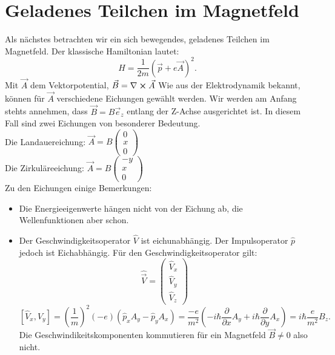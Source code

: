 \documentclass{report}
\begin{document}
\section{Geladenes Teilchen im Magnetfeld}
Als nächstes betrachten wir ein sich bewegendes, geladenes Teilchen im Magnetfeld. Der klassische Hamiltonian lautet: \[
	H = \frac{1}{2m} (\vec{p} + e\vec{A})^2
.\] Mit $\vec{A}$ dem Vektorpotential, $\vec{B} = \nabla \cross \vec{A}$
Wie aus der Elektrodynamik bekannt, können für $\vec{A}$ verschiedene Eichungen gewählt werden. Wir werden am Anfang stehts annehmen, dass $\vec{B} = B \vec{e}_z$ entlang der Z-Achse ausgerichtet ist. In diesem Fall sind zwei Eichungen von besonderer Bedeutung.\\
Die Landauereichung: $\vec{A} = B \begin{pmatrix} 0 \\ x \\ 0 \end{pmatrix} $ \\
Die Zirkuläreeichung: $\vec{A} = B \begin{pmatrix} -y \\ x \\ 0 \end{pmatrix} $ \\
Zu den Eichungen einige Bemerkungen: 
\begin{itemize}
	\item Die Energieeigenwerte hängen nicht von der Eichung ab, die Wellenfunktionen aber schon. 
	\item Der Geschwindigkeitsoperator $\hat{V}$ ist eichunabhängig. Der Impulsoperator $\hat{p}$ jedoch ist Eichabhängig. Für den Geschwindigkeitsoperator gilt: \[
			\hat{\vec{V}} = \begin{pmatrix} \hat{V}_x \\ \hat{V}_y \\ \hat{V}_z \end{pmatrix} 
	\] \[
	[\hat{V}_x, \hat{V}_y] = \left( \frac{1}{m} \right) ^2 (-e) (\hat{p}_x A_y - \hat{p}_y A_x) = \frac{-e}{m^2} \left( -i\hbar \frac{\partial}{\partial x}A_y + i \hbar \frac{\partial}{\partial y} A_x \right) = i \hbar \frac{e}{m^2} B_z
.\] Die Geschwindikeitskomponenten kommutieren für ein Magnetfeld $\vec{B} \neq 0$ also nicht.  
\end{itemize}
\end{document}
